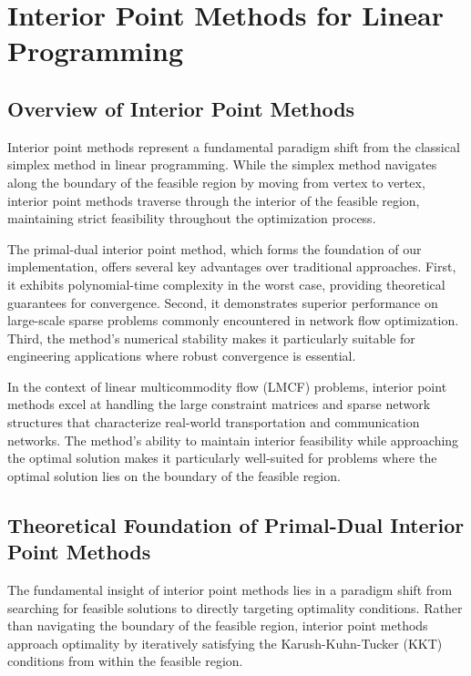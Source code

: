 
\section{Interior Point Methods for Linear Programming}

\subsection{Overview of Interior Point Methods}

Interior point methods represent a fundamental paradigm shift from the classical simplex method in linear programming. While the simplex method navigates along the boundary of the feasible region by moving from vertex to vertex, interior point methods traverse through the interior of the feasible region, maintaining strict feasibility throughout the optimization process.

The primal-dual interior point method, which forms the foundation of our implementation, offers several key advantages over traditional approaches. First, it exhibits polynomial-time complexity in the worst case, providing theoretical guarantees for convergence. Second, it demonstrates superior performance on large-scale sparse problems commonly encountered in network flow optimization. Third, the method's numerical stability makes it particularly suitable for engineering applications where robust convergence is essential.

In the context of linear multicommodity flow (LMCF) problems, interior point methods excel at handling the large constraint matrices and sparse network structures that characterize real-world transportation and communication networks. The method's ability to maintain interior feasibility while approaching the optimal solution makes it particularly well-suited for problems where the optimal solution lies on the boundary of the feasible region.

\subsection{Theoretical Foundation of Primal-Dual Interior Point Methods}

The fundamental insight of interior point methods lies in a paradigm shift from searching for feasible solutions to directly targeting optimality conditions. Rather than navigating the boundary of the feasible region, interior point methods approach optimality by iteratively satisfying the Karush-Kuhn-Tucker (KKT) conditions from within the feasible region.

